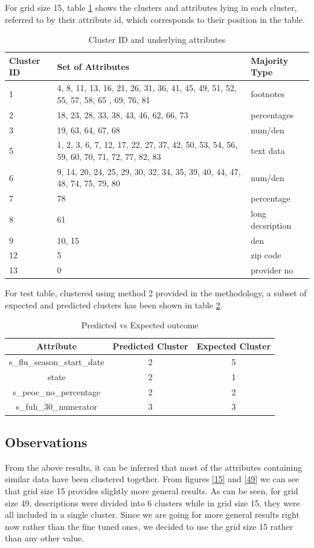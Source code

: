 \documentclass[conference]{IEEEtran}
\begin{document}
For grid size 15, table \ref{clusters} shows the clusters and attributes lying in each cluster, referred to by their attribute id, which corresponds to their position in the table. 

\begin{table}[h]
\centering
\caption{Cluster ID and underlying attributes}
\begin{tabular}{|l|p{5cm}|l|}
\hline
Cluster ID & Set of Attributes & Majority Type\\
\hline \hline
1 & 4, 8, 11, 13, 16, 21, 26, 31, 36, 41, 45, 49, 51, 52, 55, 57, 58, 65 , 69, 76, 81 & footnotes\\
2 & 18, 23, 28, 33, 38, 43, 46, 62, 66, 73 & percentages \\
3 & 19, 63, 64, 67, 68 & num/den\\
5 & 1, 2, 3, 6, 7, 12, 17, 22, 27, 37, 42, 50, 53, 54, 56, 59, 60, 70, 71, 72, 77, 82, 83 & text data\\
6 & 9, 14, 20, 24, 25, 29, 30, 32, 34, 35, 39, 40, 44, 47, 48, 74, 75, 79, 80 & num/den\\ 
7 & 78 & percentage\\
8 & 61 & long decsription\\
9 & 10, 15 & den\\
12 & 5 & zip code\\
13 & 0 & provider no\\
\hline
\end{tabular}
\label{clusters}
\end{table}

For test table, clustered using method 2 provided in the methodology, a subset of expected and predicted clusters has been shown in table \ref{result}.

\begin{table}
\centering
\caption{Predicted vs Expected outcome}
\begin{tabular}{|c|c|c|}
\hline
Attribute & Predicted Cluster & Expected Cluster\\
\hline \hline
s\_flu\_season\_start\_date	 & 2 & 5\\
state & 2 & 1\\
s\_peoc\_no\_percentage & 2 & 2\\
s\_fuh\_30\_numerator & 3 & 3\\
\hline
\end{tabular}
\label{result}
\end{table}

\subsection*{Observations}
From the above results, it can be inferred that most of the attributes containing similar data have been clustered together. From figures \ref{15} and \ref{49} we can see that grid size 15 provides slightly more general results. As can be seen, for grid size 49, descriptions were divided into 6 clusters while in grid size 15, they were all included in a single cluster. Since we are going for more general results right now rather than the fine tuned ones, we decided to use the grid size 15 rather than any other value. 
\end{document}
